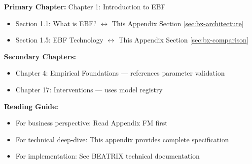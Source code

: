 %
%
%

%
%
%
%

\begin{tcolorbox}[colback=purple!5!white, colframe=purple!75!black,
    title=Chapter Linkage]

\textbf{Primary Chapter:} Chapter 1: Introduction to EBF
\begin{itemize}[nosep]
\item Section 1.1: What is EBF? $\leftrightarrow$ This Appendix Section \ref{sec:bx-architecture}
\item Section 1.5: EBF Technology $\leftrightarrow$ This Appendix Section \ref{sec:bx-comparison}
\end{itemize}

\textbf{Secondary Chapters:}
\begin{itemize}[nosep]
\item Chapter 4: Empirical Foundations --- references parameter validation
\item Chapter 17: Interventions --- uses model registry
\end{itemize}

\textbf{Reading Guide:}
\begin{itemize}[nosep]
\item For business perspective: Read Appendix FM first
\item For technical deep-dive: This appendix provides complete specification
\item For implementation: See BEATRIX technical documentation
\end{itemize}

\end{tcolorbox}

